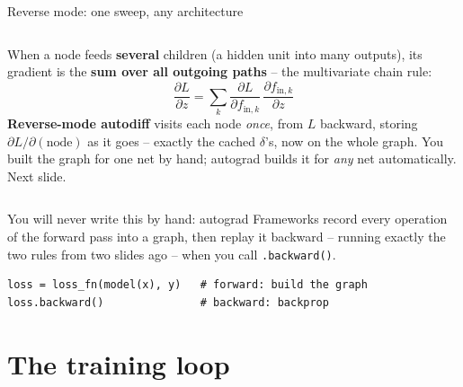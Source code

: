 \documentclass[aspectratio=169]{beamer}
\begin{document}
\begin{frame}{Reverse mode: one sweep, any architecture}
  \begin{columns}[T]
    When a node feeds \textbf{several} children (a hidden unit into many outputs), its gradient
    is the \textbf{sum over all outgoing paths} -- the multivariate chain rule:
    \[
      \frac{\partial L}{\partial z} = \sum_{k}
        \frac{\partial L}{\partial f_{\text{in},k}}\,
        \frac{\partial f_{\text{in},k}}{\partial z}
    \]
    \textbf{Reverse-mode autodiff} visits each node \emph{once}, from $L$ backward, storing
    $\partial L/\partial(\text{node})$ as it goes -- exactly the cached $\delta$'s, now on the
    whole graph.
    \vskip 4pt
    \footnotesize You built the graph for one net by hand; autograd builds it for \emph{any} net
    automatically. Next slide.
  \end{columns}
\end{frame}

\begin{frame}[fragile]{You will never write this by hand: autograd}
  Frameworks record every operation of the forward pass into a graph, then replay it backward
  -- running exactly the two rules from two slides ago -- when you call \texttt{.backward()}.
  \vfill
{\lstset{basicstyle=\ttfamily\small}
\begin{lstlisting}
loss = loss_fn(model(x), y)   # forward: build the graph
loss.backward()               # backward: backprop
\end{lstlisting}}
  \vfill
\end{frame}

\section{The training loop}
\end{document}
